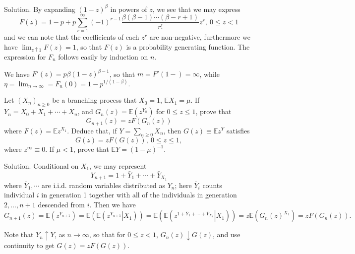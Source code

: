 Solution. By expanding $(1-z)^\beta$ in powers of $z$, we see that we may express
\begin{equation}
F(z)=1-p+p\sum^\infty_{r=1}(-1)^{r-1}\frac{\beta(\beta-1)\cdots(\beta-r+1)}{r!}z^r,\ 0\leq z < 1
\end{equation} 
and we can note that the coefficients of each $z^r$ are non-negative, furthermore we have $\lim_{z\uparrow 1}F(z)=1$, so that $F(z)$ is a probability generating function. The expression for $F_n$ follows easily by induction on $n$. 

We have $F'(z)=p\beta(1-z)^{\beta-1}$, so that $m=F'(1-)=\infty$, while $\eta=\lim_{n\to\infty}=F_n(0)=1-p^{1/(1-\beta)}$.



\item Let $(X_n)_{n\geq 0}$ be a branching process that $X_0=1$, $\mathbb{E}X_1=\mu$. If $Y_n=X_0+X_1+\cdots+X_n$, and $G_n(z)=\mathbb{E}\left(z^{Y_n}\right)$ for $0\leq z\leq 1$, prove that 
\begin{equation}
G_{n+1}(z)=zF\left(G_n(z)\right)
\end{equation} 
where $F(z)=\mathbb{E}z^{X_1}$. Deduce that, if $Y=\sum_{n\geq 0}X_n$, then $G(z)\equiv\mathbb{E}z^Y$ satisfies
\begin{equation}
G(z)=zF\left(G(z)\right), \ 0\leq z\leq 1,
\end{equation} 
where $z^\infty\equiv 0$. If $\mu<1$, prove that $\mathbb{E}Y=(1-\mu)^{-1}$.



Solution. Conditional on $X_1$, we may represent
\begin{equation}
Y_{n+1} = 1+\bar{Y}_1 + \cdots + \bar{Y}_{X_1}
\end{equation} 
where $\bar{Y}_1,\cdots $ are i.i.d. random variables distributed as $Y_n$; here $\bar{Y}_i$ counts individual $i$ in generation 1 together with all of the individuals in generation $2,\dots,n+1$ descended from $i$. Then we have
\begin{equation}
G_{n+1}(z) = \mathbb{E}\left(z^{Y_{n+1}}\right) = \mathbb{E}\left(\mathbb{E}\left.\left(z^{Y_{n+1}}\right|X_1\right)\right) = \mathbb{E}\left(\mathbb{E}\left.\left(z^{1+ \bar{Y}_1 + \cdots + \bar{Y}_{X_1} }\right|X_1\right)\right) = z\mathbb{E}\left(G_n(z)^{X_1}\right) = zF(G_n(z)).
\end{equation}

Note that $Y_n\uparrow Y$, as $n\to \infty$, so that for $0\leq z <1$, $G_n(z)\downarrow G(z)$, and use continuity to get $G(z)=zF\left(G(z)\right)$. 

